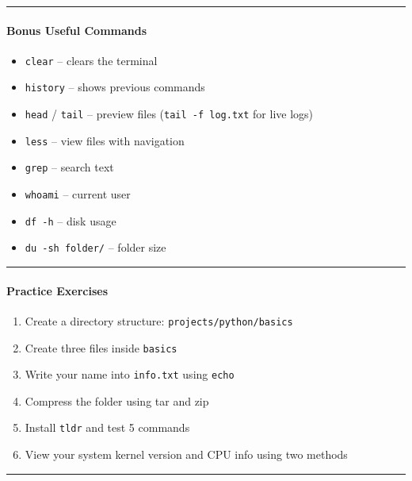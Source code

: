 \documentclass[
  english,
  paper=a4,
  oneside  ,captions=tableheading
]{scrartcl}
\providecommand{\tightlist}{%
  \setlength{\itemsep}{0pt}\setlength{\parskip}{0pt}}
\begin{document}
\begin{center}\rule{0.5\linewidth}{0.5pt}\end{center}

\paragraph{Bonus Useful Commands}\label{bonus-useful-commands}

\begin{itemize}
\tightlist
\item
  \texttt{clear} -- clears the terminal
\item
  \texttt{history} -- shows previous commands
\item
  \texttt{head} / \texttt{tail} -- preview files
  (\texttt{tail\ -f\ log.txt} for live logs)
\item
  \texttt{less} -- view files with navigation
\item
  \texttt{grep} -- search text
\item
  \texttt{whoami} -- current user
\item
  \texttt{df\ -h} -- disk usage
\item
  \texttt{du\ -sh\ folder/} -- folder size
\end{itemize}

\begin{center}\rule{0.5\linewidth}{0.5pt}\end{center}

\paragraph{Practice Exercises}\label{practice-exercises}

\begin{enumerate}
\def\labelenumi{\arabic{enumi}.}
\tightlist
\item
  Create a directory structure: \texttt{projects/python/basics}
\item
  Create three files inside \texttt{basics}
\item
  Write your name into \texttt{info.txt} using \texttt{echo}
\item
  Compress the folder using tar and zip
\item
  Install \texttt{tldr} and test 5 commands
\item
  View your system kernel version and CPU info using two methods
\end{enumerate}

\begin{center}\rule{0.5\linewidth}{0.5pt}\end{center}
\end{document}

